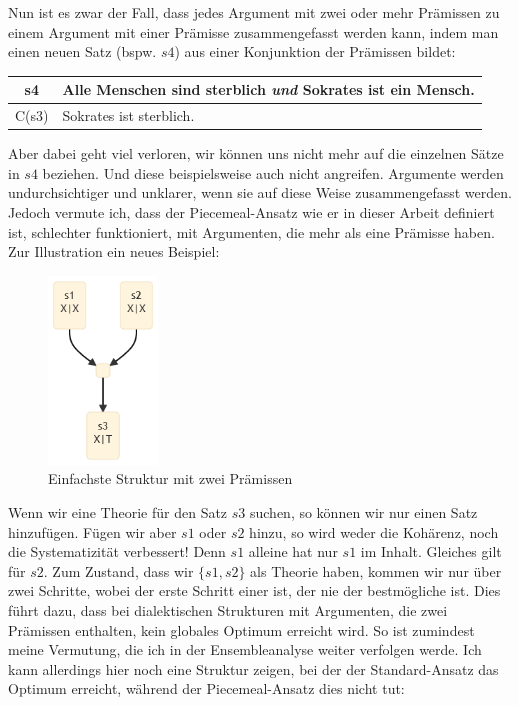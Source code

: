 \documentclass{article}
\begin{document}
Nun ist es zwar der Fall, dass jedes Argument mit zwei oder mehr Prämissen zu einem Argument mit einer Prämisse zusammengefasst werden kann, indem man einen neuen Satz (bspw. $s4$) aus einer Konjunktion der Prämissen bildet:

\begin{center}
\begin{tabular}{c p{9cm}}
s4 & Alle Menschen sind sterblich \textit{und} Sokrates ist ein Mensch.\\\hline
C(s3) & Sokrates ist sterblich. 
\end{tabular}
\end{center}

Aber dabei geht viel verloren, wir können uns nicht mehr auf die einzelnen Sätze in $s4$ beziehen. Und diese beispielsweise auch nicht angreifen. Argumente werden undurchsichtiger und unklarer, wenn sie auf diese Weise zusammengefasst werden.
Jedoch vermute ich, dass der Piecemeal-Ansatz wie er in dieser Arbeit definiert ist, schlechter funktioniert, mit Argumenten, die mehr als eine Prämisse haben. Zur Illustration ein neues Beispiel:

\begin{figure}[ht]
  \centering
  \includegraphics[width=\textwidth,height=5cm,keepaspectratio]{images/2prem.png}
  \caption{Einfachste Struktur mit zwei Prämissen\label{fig:2prem}}
\end{figure}

Wenn wir eine Theorie für den Satz $s3$ suchen, so können wir nur einen Satz hinzufügen. Fügen wir aber $s1$ oder $s2$ hinzu, so wird weder die Kohärenz, noch die Systematizität verbessert! Denn $s1$ alleine hat nur $s1$ im Inhalt. Gleiches gilt für $s2$. Zum Zustand, dass wir $\{s1,s2\}$ als Theorie haben, kommen wir nur über zwei Schritte, wobei der erste Schritt einer ist, der nie der bestmögliche ist. Dies führt dazu, dass bei dialektischen Strukturen mit Argumenten, die zwei Prämissen enthalten, kein globales Optimum erreicht wird. So ist zumindest meine Vermutung, die ich in der Ensembleanalyse weiter verfolgen werde. Ich kann allerdings hier noch eine Struktur zeigen, bei der der Standard-Ansatz das Optimum erreicht, während der Piecemeal-Ansatz dies nicht tut:
\end{document}
